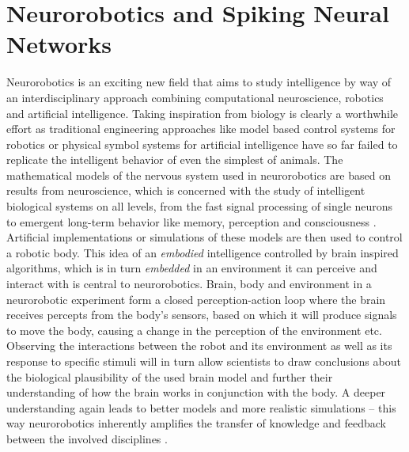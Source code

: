 \section{Neurorobotics and Spiking Neural Networks}
Neurorobotics is an exciting new field that aims to study intelligence by way of an interdisciplinary approach combining computational neuroscience, robotics and artificial intelligence. Taking inspiration from biology is clearly a worthwhile effort as traditional engineering approaches like model based control systems for robotics or physical symbol systems for artificial intelligence have so far failed to replicate the intelligent behavior of even the simplest of animals. The mathematical models of the nervous system used in neurorobotics are based on results from neuroscience, which is concerned with the study of intelligent biological systems on all levels, from the fast signal processing of single neurons to emergent long-term behavior like memory, perception and consciousness \cite{BLOOM20133,BELL2013947,MANNS20131029, KOCH20131091, BYRNE20131009}. Artificial implementations or simulations of these models are then used to control a robotic body. This idea of an \emph{embodied} intelligence controlled by brain inspired algorithms, which is in turn \emph{embedded} in an environment it can perceive and interact with is central to neurorobotics. Brain, body and environment in a neurorobotic experiment form a closed perception-action loop where the brain receives percepts from the body's sensors, based on which it will produce signals to move the body, causing a change in the perception of the environment etc. Observing the interactions between the robot and its environment as well as its response to specific stimuli will in turn allow scientists to draw conclusions about the biological plausibility of the used brain model and further their understanding of how the brain works in conjunction with the body. A deeper understanding again leads to better models and more realistic simulations -- this way neurorobotics inherently amplifies the transfer of knowledge and feedback between the involved disciplines \cite{knoll2016neurorobotics}.

